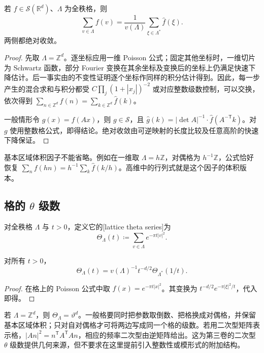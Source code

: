 \begin{theorem}\label{b2:thm:06-lattice-poisson}
若 \(f\in\mathcal S(\mathbb R^d)\)、\(\Lambda\) 为全秩格，则
\[
 \sum_{v\in\Lambda}f(v)
 =\dfrac1{v(\Lambda)}\sum_{\xi\in\Lambda^*}\widehat f(\xi).
\]
两侧都绝对收敛。
\end{theorem}
\begin{proof}
先取 \(\Lambda=\mathbb Z^d\)。逐坐标应用一维 Poisson 公式；固定其他坐标时，一维切片为 Schwartz 函数，部分 Fourier 变换在其余坐标及变换后的坐标上仍满足快速下降估计。后一事实由的不变性证明逐个坐标作同样的积分估计得到。因此，每一步产生的混合求和与积分都受 \(C\prod_j(1+|x_j|)^{-2}\) 或对应整数级数控制，可以交换，依次得到 \(\sum_{n\in\mathbb Z^d}f(n)=\sum_{k\in\mathbb Z^d}\widehat f(k)\)。

一般情形令 \(g(x)=f(Ax)\)，则 \(g\in\mathcal S\)，且 \(\widehat g(k)=|\det A|^{-1}\cdot\widehat f(A^{-\mathsf T}k)\)。对 \(g\) 使用整数格公式，即得结论。绝对收敛由可逆映射的长度比较及任意高阶的快速下降保证。
\end{proof}

基本区域体积因子不能省略。例如在一维取 \(\Lambda=h\mathbb Z\)，对偶格为 \(h^{-1}\mathbb Z\)，公式恰好恢复 \(\sum_nf(hn)=h^{-1}\sum_k\widehat f(k/h)\)。高维中的行列式就是这个因子的体积版本。

\subsection{格的 \texorpdfstring{\(\theta\)}{\AnalysisPdfTheta} 级数}
\label{b2:subsec:060403}

\begin{definition}\label{b2:def:06-lattice-theta}
对全秩格 \(\Lambda\) 与 \(t>0\)，定义它的[lattice theta series]为
\[
 \Theta_\Lambda(t)\coloneqq\sum_{v\in\Lambda}e^{-\pi t|v|^2}.
\]
\end{definition}

\begin{corollary}\label{b2:cor:06-lattice-theta}
对所有 \(t>0\)，
\[
 \Theta_\Lambda(t)=v(\Lambda)^{-1}t^{-d/2}\Theta_{\Lambda^*}(1/t).
\]
\end{corollary}
\begin{proof}
在格上的 Poisson 公式中取 \(f(x)=e^{-\pi t|x|^2}\)。其变换为 \(t^{-d/2}e^{-\pi|\xi|^2/t}\)，代入即得。
\end{proof}

若 \(\Lambda=\mathbb Z^d\)，则 \(\Theta_\Lambda=\vartheta^d\)。一般格要同时把参数取倒数、把格换成对偶格，并保留基本区域体积；只对自对偶格才可将两边写成同一个格的级数。若用二次型矩阵表示格，\(|An|^2=n^{\mathsf T}A^{\mathsf T}An\)，相应的频率二次型由逆矩阵给出。这为第三卷的二次型 \(\theta\) 级数提供几何来源，但不要求在这里提前引入整数性或模形式的附加结构。
